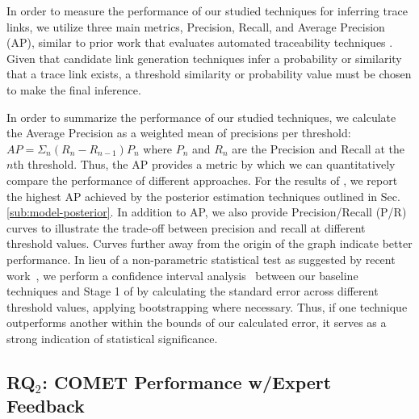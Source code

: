 In order to measure the performance of our studied techniques for inferring trace links, we utilize three main metrics, Precision, Recall, and Average Precision (AP), similar to prior work that evaluates automated traceability techniques \citep{Gethers:ICSM'11,Guo:ICSE'17}. Given that candidate link generation techniques infer a probability or similarity that a trace link exists, a threshold similarity or probability value must be chosen to make the final inference. 

In order to summarize the performance of our studied techniques, we calculate the Average Precision as a weighted mean of precisions per threshold: $AP = \Sigma_n(R_n-R_{n-1})P_n$ where $P_n$ and $R_n$ are the Precision and Recall at the $n$th threshold. Thus, the AP provides a metric by which we can quantitatively compare the performance of different approaches. For the results of \Comet, we report the highest AP achieved by the posterior estimation techniques outlined in Sec. \ref{sub:model-posterior}. In addition to AP, we also provide Precision/Recall (P/R) curves to illustrate the trade-off between precision and recall at different threshold values. Curves further away from the origin of the graph indicate better performance. In lieu of a non-parametric statistical test as suggested by recent work~\citep{Furia:TSE'19}, we perform a confidence interval analysis~\citep{Neyman:37} between our baseline techniques and Stage 1 of \Comet by calculating the standard error across different threshold values, applying bootstrapping where necessary. Thus, if one technique outperforms another within the bounds of our calculated error, it serves as a strong indication of statistical significance.


\subsection{RQ$_2$: C{\footnotesize OMET} Performance w/Expert Feedback}
\label{sub:study-rq2}

